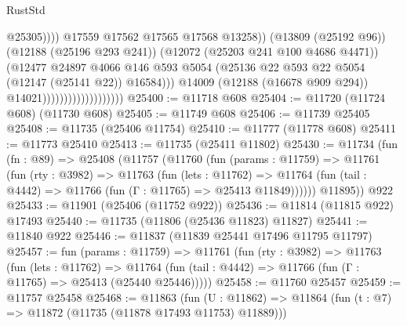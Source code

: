 \begin{lexlean}{RustStd}
\begin{coremodule}
                                                        @25305))))
                                                @17559
                                                @17562
                                                @17565
                                                @17568
                                                @13258))
                                            (@13809 (@25192 @96))
                                            (@12188 (@25196 @293 @241))
                                            (@12072 (@25203 @241 @100 @4686 @4471))
                                            (@12477
                                              @24897
                                              @4066
                                              @146
                                              @593
                                              @5054
                                              (@25136
                                                @22
                                                @593
                                                @22
                                                @5054
                                                (@12147 (@25141 @22))
                                                @16584)))
                                          @14009
                                          (@12188 (@16678 @909 @294))
                                          @14021)))))))))))))))))))
@25400 := @11718 @608
@25404 := @11720 (@11724 @608) (@11730 @608)
@25405 := @11749 @608
@25406 := @11739 @25405
@25408 := @11735 (@25406 @11754)
@25410 := @11777 (@11778 @608)
@25411 := @11773 @25410
@25413 := @11735 (@25411 @11802)
@25430 := @11734
    (fun (fn : @89) =>
    @25408
      (@11757
        (@11760
          (fun (params : @11759) =>
          @11761
            (fun (rty : @3982) =>
            @11763
              (fun (lets : @11762) =>
              @11764 (fun (tail : @4442) => @11766 (fun (Γ : @11765) => @25413 @11849))))))
        @11895))
    @922
@25433 := @11901 (@25406 (@11752 @922))
@25436 := @11814 (@11815 @922) @17493
@25440 := @11735 (@11806 (@25436 @11823) @11827)
@25441 := @11840 @922
@25446 := @11837 (@11839 @25441 @17496 @11795 @11797)
@25457 := fun (params : @11759) =>
  @11761
    (fun (rty : @3982) =>
    @11763
      (fun (lets : @11762) =>
      @11764 (fun (tail : @4442) => @11766 (fun (Γ : @11765) => @25413 (@25440 @25446)))))
@25458 := @11760 @25457
@25459 := @11757 @25458
@25468 := @11863
    (fun (U : @11862) => @11864 (fun (t : @7) => @11872 (@11735 (@11878 @17493 @11753) @11889)))

\end{coremodule}
\end{lexlean}
